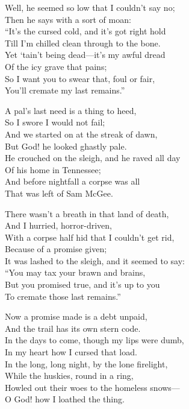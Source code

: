 \begin{poemblock}
Well, he seemed so low that I couldn’t say no;\\
\idt Then he says with a sort of moan:\\
“It’s the cursed cold, and it’s got right hold\\
\idt Till I’m chilled clean through to the bone.\\
Yet ‘tain’t being dead—it’s my awful dread\\
\idt Of the icy grave that pains;\\
So I want you to swear that, foul or fair,\\
\idt You’ll cremate my last remains.”

A pal’s last need is a thing to heed,\\
\idt So I swore I would not fail;\\
And we started on at the streak of dawn,\\
\idt But God! he looked ghastly pale.\\
He crouched on the sleigh, and he raved all day\\
\idt Of his home in Tennessee;\\
And before nightfall a corpse was all\\
\idt That was left of Sam McGee.

There wasn’t a breath in that land of death,\\
\idt And I hurried, horror-driven,\\
With a corpse half hid that I couldn’t get rid,\\
\idt Because of a promise given;\\
It was lashed to the sleigh, and it seemed to say:\\
\idt “You may tax your brawn and brains,\\
But you promised true, and it’s up to you\\
\idt To cremate those last remains.”

Now a promise made is a debt unpaid,\\
\idt And the trail has its own stern code.\\
In the days to come, though my lips were dumb,\\
\idt In my heart how I cursed that load.\\
In the long, long night, by the lone firelight,\\
\idt While the huskies, round in a ring,\\
Howled out their woes to the homeless snows—\\
\idt O God! how I loathed the thing.


\end{poemblock}
